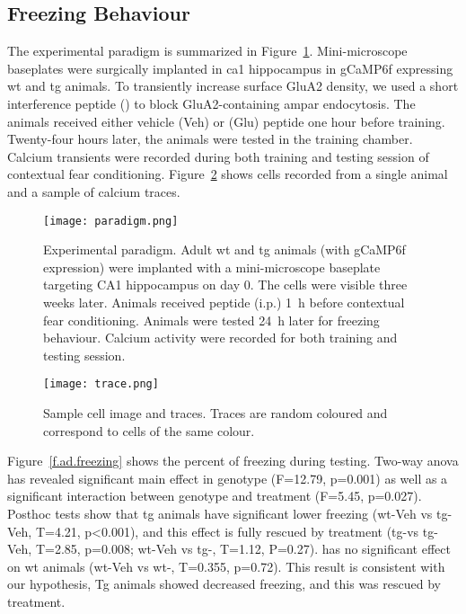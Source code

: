 \subsection{Freezing Behaviour}
The experimental paradigm is summarized in Figure~\ref{f.ad.paradigm}. Mini-microscope baseplates were surgically implanted in \gls{ca1} hippocampus in gCaMP6f expressing \gls{wt} and \gls{tg} animals. To transiently increase surface GluA2 density, we used a short interference peptide (\tglu) to block GluA2-containing \gls{ampar} endocytosis. The animals received either vehicle (Veh) or \tglu{} (Glu) peptide one hour before training. Twenty-four hours later, the animals were tested in the training chamber. Calcium transients were recorded during both training and testing session of contextual fear conditioning. Figure~\ref{f.ad.trace} shows cells recorded from a single animal and a sample of calcium traces. 
\begin{figure}[h]
    \texttt{[image: paradigm.png]}
    \caption{Experimental paradigm. Adult \gls{wt} and \gls{tg} animals (with gCaMP6f expression) were implanted with a mini-microscope baseplate targeting CA1 hippocampus on day 0. The cells were visible three weeks later. Animals received \tglu peptide (i.p.) \SI{1}{\hour} before contextual fear conditioning. Animals were tested \SI{24}{\hour} later for freezing behaviour. Calcium activity were recorded for both training and testing session. \label{f.ad.paradigm}}
\end{figure}

\begin{figure}[h]
    \texttt{[image: trace.png]}
    \caption{Sample cell image and traces. Traces are random coloured and correspond to cells of the same colour. \label{f.ad.trace}}
\end{figure}

Figure~\ref{f.ad.freezing} shows the percent of freezing during testing. Two-way \gls{anova} has revealed significant main effect in genotype (F=12.79, p=0.001) as well as a significant interaction between genotype and treatment (F=5.45, p=0.027). Posthoc tests show that \gls{tg} animals have significant lower freezing (\gls{wt}-Veh vs \gls{tg}-Veh, T=4.21, p<0.001), and this effect is fully rescued by \tglu treatment (\gls{tg}-\tglu vs \gls{tg}-Veh, T=2.85, p=0.008; \gls{wt}-Veh vs \gls{tg}-\tglu, T=1.12, P=0.27). \tglu has no significant effect on \gls{wt} animals (\gls{wt}-Veh vs \gls{wt}-\tglu, T=0.355, p=0.72). This result is consistent with our hypothesis, Tg animals showed decreased freezing, and this was rescued by \tglu treatment. 

